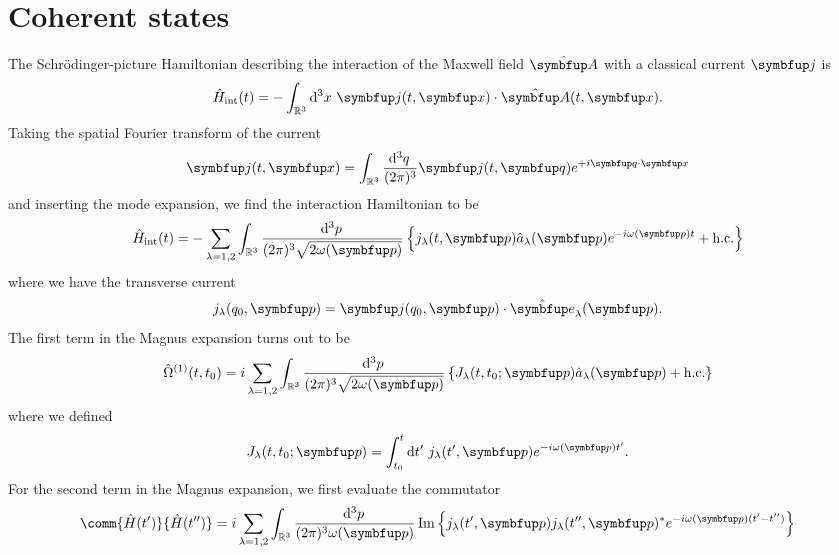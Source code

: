 \section{Coherent states}



The Schrödinger-picture Hamiltonian describing the interaction of the Maxwell field $\vu{A}$ with a classical current $\vb{j}$ is
\begin{equation}
	\hat{H}_\text{int}(t)
	=
	-
	\int_{\mathbb{R}^3}\dd[3]{x}
	\vb{j}(t,\vb{x})
	\vdot
	\hat{\vb{A}}(t,\vb{x})
	.
\end{equation}
Taking the spatial Fourier transform of the current
\begin{equation}
	\vb{j}(t,\vb{x})
	=
	\int_{\mathbb{R}^3}\frac{\dd[3]{q}}{(2\pi)^3}
	\vb{j}(t,\vb{q})
	e^{+i\vb{q}\vdot\vb{x}}
\end{equation}
and inserting the mode expansion, we find the interaction Hamiltonian to be
\begin{equation}
	\hat{H}_\text{int}(t)
	=
	-
	\sum_{\lambda=1,2}
	\int_{\mathbb{R}^3}\frac{\dd[3]{p}}{(2\pi)^3\sqrt{2\omega(\vb{p})}}
	\left\{
		j_\lambda(t,\vb{p})
		\hat{a}_\lambda(\vb{p})
		e^{-i\omega(\vb{p})t}
		+
		\text{h.c.}
	\right\}
\end{equation}
where we have the transverse current
\begin{equation}
	j_\lambda(q_0,\vb{p})
	=
	\vb{j}(q_0,\vb{p})
	\vdot
	\vu{e}_\lambda(\vb{p})
	.
\end{equation}
The first term in the Magnus expansion turns out to be
\begin{equation}
	\hat{\Omega}^{(1)}(t,t_0)
	=
	i
	\sum_{\lambda=1,2}
	\int_{\mathbb{R}^3}\frac{\dd[3]{p}}{(2\pi)^3\sqrt{2\omega(\vb{p})}}
	\left\{
		J_\lambda(t,t_0;\vb{p})
		\hat{a}_\lambda(\vb{p})
		+
		\text{h.c.}
	\right\}
\end{equation}
where we defined
\begin{equation}
	J_\lambda(t,t_0;\vb{p})
	=
	\int_{t_0}^t\dd{t^\prime}
	j_\lambda(t^\prime,\vb{p})
	e^{-i\omega(\vb{p})t^\prime}
	.
\end{equation}
For the second term in the Magnus expansion, we first evaluate the commutator
\begin{equation}
	\comm{\hat{H}(t^\prime)}{\hat{H}(t^{\prime\prime})}
	=
	i\sum_{\lambda=1,2}
	\int_{\mathbb{R}^3}\frac{\dd[3]{p}}{(2\pi)^3\omega(\vb{p})}
	\Im\left\{
		j_\lambda(t^\prime,\vb{p})
		j_\lambda(t^{\prime\prime},\vb{p})^*
		e^{-i\omega(\vb{p})(t^\prime-t^{\prime\prime})}
	\right\}
\end{equation}
